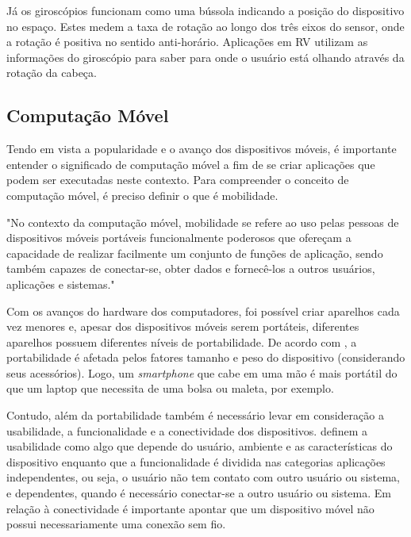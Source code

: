 Já os giroscópios funcionam como uma bússola indicando a posição do dispositivo no espaço. Estes medem a taxa de rotação ao longo dos três eixos do sensor, onde a rotação é positiva no sentido anti-horário. Aplicações em RV utilizam as informações do giroscópio para saber para onde o usuário está olhando através da rotação da cabeça. \cite{android}

\subsection{Computação Móvel}
\label{ss.computacaomovel}

Tendo em vista a popularidade e o avanço dos dispositivos móveis, é importante entender o significado de computação móvel a fim de se criar aplicações que podem ser executadas neste contexto. Para compreender o conceito de computação móvel, é preciso definir o que é mobilidade.

\begin{citacao}
	"No contexto da computação móvel, mobilidade se refere ao uso pelas pessoas de dispositivos móveis portáveis funcionalmente poderosos que ofereçam a capacidade de realizar facilmente um conjunto de funções de aplicação, sendo também capazes de conectar-se, obter dados e fornecê-los a outros usuários, aplicações e sistemas." \cite[p. ~1]{lee}
\end{citacao}

Com os avanços do hardware dos computadores, foi possível criar aparelhos cada vez menores e, apesar dos dispositivos móveis serem portáteis, diferentes aparelhos possuem diferentes níveis de portabilidade. De acordo com , a portabilidade é afetada pelos fatores tamanho e peso do dispositivo (considerando seus acessórios). Logo, um \textit{smartphone} que cabe em uma mão é mais portátil do que um laptop que necessita de uma bolsa ou maleta, por exemplo. 

Contudo, além da portabilidade também é necessário levar em consideração a usabilidade, a funcionalidade e a conectividade dos dispositivos.  definem a usabilidade como algo que depende do usuário, ambiente e as características do dispositivo enquanto que a funcionalidade é dividida nas categorias aplicações independentes, ou seja, o usuário não tem contato com outro usuário ou sistema, e dependentes, quando é necessário conectar-se a outro usuário ou sistema. Em relação à conectividade é importante apontar que um dispositivo móvel não possui necessariamente uma conexão sem fio.


